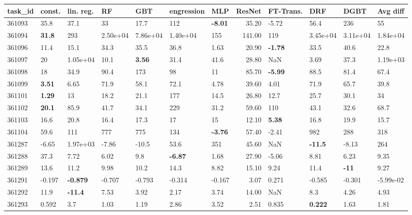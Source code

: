 \begin{table}[ht!]
\centering
\begingroup\footnotesize
\begin{tabular}{lllllllrllll}
  \hline
\hline
task\_id & const. & lin. reg. & RF & GBT & engression & MLP & ResNet & FT-Trans. & DRF & DGBT & Avg diff \\ 
  \hline
361093 & 35.8 & 37.1 & 33 & 17.7 & 112 & \textbf{-8.01} & 35.20 & -5.72 & 56.4 & 236 & 55 \\ 
  361094 & \textbf{31.8} & 293 &  2.50e+04 &  7.86e+04 &  1.40e+04 & 155 & 141.00 & 119 &  3.45e+04 &  3.11e+04 &  1.84e+04 \\ 
  361096 & 11.4 & 15.1 & 34.3 & 35.5 & 36.8 & 1.63 & 20.90 & \textbf{-1.78} & 33.5 & 40.6 & 22.8 \\ 
  361097 & 20 &  1.05e+04 & 10.1 & \textbf{3.56} & 31.4 & 41.6 & 28.80 & NaN & 3.69 & 37.3 &  1.19e+03 \\ 
  361098 & 18 & 34.9 & 90.4 & 173 & 98 & 11 & 85.70 & \textbf{-5.99} & 88.5 & 81.4 & 67.4 \\ 
  361099 & \textbf{3.51} & 6.65 & 71.9 & 58.1 & 72.1 & 4.78 & 39.60 & 4.01 & 71.9 & 65.7 & 39.8 \\ 
  361101 & \textbf{1.29} & 13 & 18.2 & 21.1 & 177 & 14.5 & 26.80 & 12.7 & 25.7 & 30.1 & 34 \\ 
  361102 & \textbf{20.1} & 85.9 & 41.7 & 34.1 & 229 & 31.2 & 59.60 & 110 & 43.1 & 32.6 & 68.7 \\ 
  361103 & 16.6 & 20.8 & 16.4 & 17.3 & 17 & 15 & 12.10 & \textbf{5.38} & 16.8 & 19.9 & 15.7 \\ 
  361104 & 59.6 & 111 & 777 & 775 & 134 & \textbf{-3.76} & 57.40 & -2.41 & 982 & 288 & 318 \\ 
  361287 & -6.65 &  1.97e+03 & -7.86 & -10.5 & 53.6 & 351 & 45.60 & NaN & \textbf{-11.5} & -8.13 & 264 \\ 
  361288 & 37.3 & 7.72 & 6.02 & 9.8 & \textbf{-6.87} & 1.68 & 27.90 & -5.06 & 8.81 & 6.23 & 9.35 \\ 
  361289 & 13.6 & 11.2 & 9.98 & 10.2 & 14.3 & 8.82 & 15.10 & 9.24 & 11.4 & \textbf{-11} & 9.27 \\ 
  361291 & -0.197 & \textbf{-0.879} & -0.707 & -0.793 & -0.314 & -0.167 & 3.07 & 0.271 & -0.585 & -0.301 & -5.99e-02 \\ 
  361292 & 11.9 & \textbf{-11.4} & 7.53 & 3.92 & 2.17 & 3.74 & 14.00 & NaN & 8.3 & 4.26 & 4.93 \\ 
  361293 & 0.592 & 3.7 & 1.03 & 1.19 & 2.86 & 3.52 & 2.51 & 0.835 & \textbf{0.222} & 1.63 & 1.81 \\ 

\end{tabular}
\end{table}

